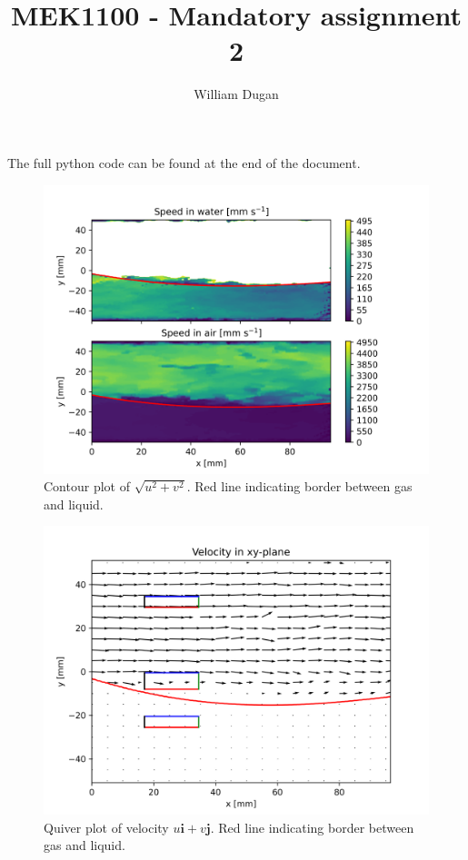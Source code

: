 \documentclass[a4paper,10pt,english]{article}
\title{MEK1100 - Mandatory assignment 2}
\author{William Dugan}
\begin{document}
\maketitle
The full python code can be found at the end of the document.

\begin{figure}[h!]
    \centering
    \includegraphics[scale=0.65]{../figures/task_b.png}
    \caption{Contour plot of $\sqrt{u^2 + v^2}$. Red line indicating border between gas and liquid.}
    \label{fig:contour_b}
\end{figure}

\begin{figure}[h!]
    \centering
    \includegraphics[scale=0.65]{../figures/task_c.png}
    \caption{Quiver plot of velocity $u\bm{i} + v\bm{j}$. Red line indicating border between gas and liquid.}
    \label{fig:quiver_c}
\end{figure}
\end{document}

